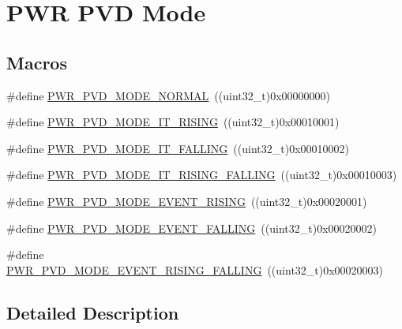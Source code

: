 \hypertarget{group___p_w_r___p_v_d___mode}{\section{P\-W\-R P\-V\-D Mode}
\label{group___p_w_r___p_v_d___mode}
}
\subsection*{Macros}
\begin{DoxyCompactItemize}
\item 
\#define \hyperlink{group___p_w_r___p_v_d___mode_ga3a4bf701a36a14a4edf4dc5a28153277}{P\-W\-R\-\_\-\-P\-V\-D\-\_\-\-M\-O\-D\-E\-\_\-\-N\-O\-R\-M\-A\-L}~((uint32\-\_\-t)0x00000000)
\item 
\#define \hyperlink{group___p_w_r___p_v_d___mode_ga102d7b8354419990a2a780f61cd020a6}{P\-W\-R\-\_\-\-P\-V\-D\-\_\-\-M\-O\-D\-E\-\_\-\-I\-T\-\_\-\-R\-I\-S\-I\-N\-G}~((uint32\-\_\-t)0x00010001)
\item 
\#define \hyperlink{group___p_w_r___p_v_d___mode_gab600a54f3a588de836cfe4b727ab8a53}{P\-W\-R\-\_\-\-P\-V\-D\-\_\-\-M\-O\-D\-E\-\_\-\-I\-T\-\_\-\-F\-A\-L\-L\-I\-N\-G}~((uint32\-\_\-t)0x00010002)
\item 
\#define \hyperlink{group___p_w_r___p_v_d___mode_gac531fbf14457e6595505354fad521b67}{P\-W\-R\-\_\-\-P\-V\-D\-\_\-\-M\-O\-D\-E\-\_\-\-I\-T\-\_\-\-R\-I\-S\-I\-N\-G\-\_\-\-F\-A\-L\-L\-I\-N\-G}~((uint32\-\_\-t)0x00010003)
\item 
\#define \hyperlink{group___p_w_r___p_v_d___mode_ga1a946b01887aa886de329a92c3ab0dd4}{P\-W\-R\-\_\-\-P\-V\-D\-\_\-\-M\-O\-D\-E\-\_\-\-E\-V\-E\-N\-T\-\_\-\-R\-I\-S\-I\-N\-G}~((uint32\-\_\-t)0x00020001)
\item 
\#define \hyperlink{group___p_w_r___p_v_d___mode_gaaedbe45f1a1ea6c30af6ac51abae0cae}{P\-W\-R\-\_\-\-P\-V\-D\-\_\-\-M\-O\-D\-E\-\_\-\-E\-V\-E\-N\-T\-\_\-\-F\-A\-L\-L\-I\-N\-G}~((uint32\-\_\-t)0x00020002)
\item 
\#define \hyperlink{group___p_w_r___p_v_d___mode_ga7455387c8e9049f9f66b46423d4f4091}{P\-W\-R\-\_\-\-P\-V\-D\-\_\-\-M\-O\-D\-E\-\_\-\-E\-V\-E\-N\-T\-\_\-\-R\-I\-S\-I\-N\-G\-\_\-\-F\-A\-L\-L\-I\-N\-G}~((uint32\-\_\-t)0x00020003)
\end{DoxyCompactItemize}


\subsection{Detailed Description}


